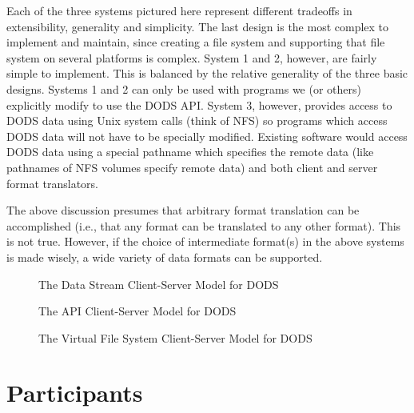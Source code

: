 Each of the three systems pictured here represent different tradeoffs in
extensibility, generality and simplicity. The last design is the most complex
to implement and maintain, since creating a file system and supporting that
file system on several platforms is complex. System 1 and 2, however, are
fairly simple to implement. This is balanced by the relative generality of
the three basic designs. Systems 1 and 2 can only be used with programs we
(or others) explicitly modify to use the DODS API. System 3, however, provides
access to DODS data using Unix system calls (think of NFS) so programs which
access DODS data will not have to be specially modified. Existing software
would access DODS data using a special pathname which specifies the remote
data (like pathnames of NFS volumes specify remote data) and both client and
server format translators.

The above discussion presumes that arbitrary format translation can be
accomplished (i.e., that any format can be translated to any other format).
This is not true. However, if the choice of intermediate format(s) in the above
systems is made wisely, a wide variety of data formats can be supported.


\begin{figure}[btp]
\caption{The Data Stream Client-Server Model for DODS}
\end{figure}

\begin{figure}[btp]
\caption{The API Client-Server Model for DODS}
\end{figure}

\begin{figure}[btp]
\caption{The Virtual File System Client-Server Model for DODS}
\end{figure}





\clearpage

\section{\bf Participants}

